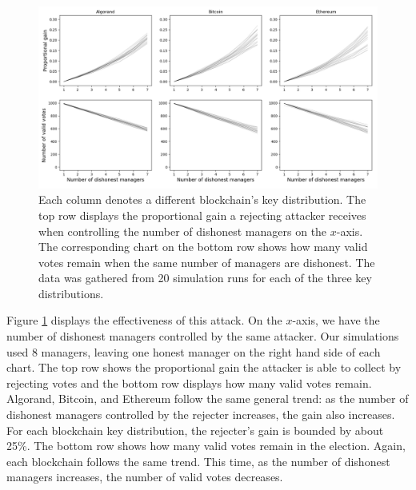 \begin{figure}[h]
	\centering
	\includegraphics[width=\linewidth]{img/rejecter}
	\caption{Each column denotes a different blockchain's key distribution. The top row displays the proportional gain a rejecting attacker receives when controlling the number of dishonest managers on the $x$-axis. The corresponding chart on the bottom row shows how many valid votes remain when the same number of managers are dishonest. The data was gathered from 20 simulation runs for each of the three key distributions.}
	\label{fig:rejecter}
\end{figure}

Figure \ref{fig:rejecter} displays the effectiveness of this attack.
On the $x$-axis, we have the number of dishonest managers controlled by the same attacker.
Our simulations used 8 managers, leaving one honest manager on the right hand side of each chart.
The top row shows the proportional gain the attacker is able to collect by rejecting votes and the bottom row displays how many valid votes remain.
Algorand, Bitcoin, and Ethereum follow the same general trend: as the number of dishonest managers controlled by the rejecter increases, the gain also increases.
For each blockchain key distribution, the rejecter's gain is bounded by about 25\%.
The bottom row shows how many valid votes remain in the election.
Again, each blockchain follows the same trend.
This time, as the number of dishonest managers increases, the number of valid votes decreases.